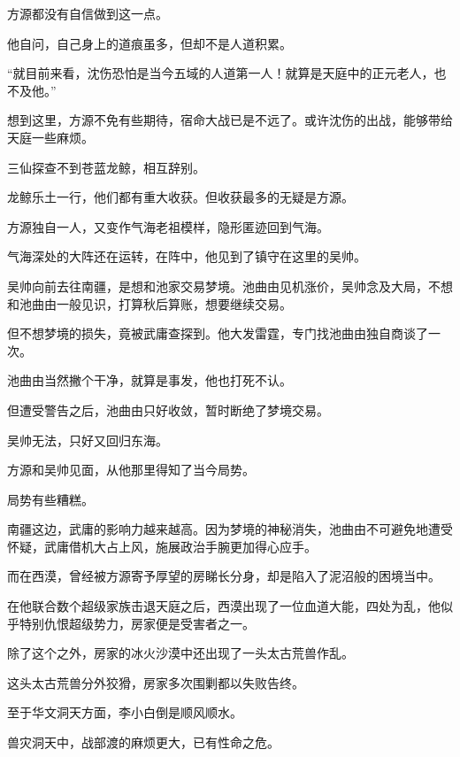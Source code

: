 \begin{this_body}
方源都没有自信做到这一点。

他自问，自己身上的道痕虽多，但却不是人道积累。

“就目前来看，沈伤恐怕是当今五域的人道第一人！就算是天庭中的正元老人，也不及他。”

想到这里，方源不免有些期待，宿命大战已是不远了。或许沈伤的出战，能够带给天庭一些麻烦。

三仙探查不到苍蓝龙鲸，相互辞别。

龙鲸乐土一行，他们都有重大收获。但收获最多的无疑是方源。

方源独自一人，又变作气海老祖模样，隐形匿迹回到气海。

气海深处的大阵还在运转，在阵中，他见到了镇守在这里的吴帅。

吴帅向前去往南疆，是想和池家交易梦境。池曲由见机涨价，吴帅念及大局，不想和池曲由一般见识，打算秋后算账，想要继续交易。

但不想梦境的损失，竟被武庸查探到。他大发雷霆，专门找池曲由独自商谈了一次。

池曲由当然撇个干净，就算是事发，他也打死不认。

但遭受警告之后，池曲由只好收敛，暂时断绝了梦境交易。

吴帅无法，只好又回归东海。

方源和吴帅见面，从他那里得知了当今局势。

局势有些糟糕。

南疆这边，武庸的影响力越来越高。因为梦境的神秘消失，池曲由不可避免地遭受怀疑，武庸借机大占上风，施展政治手腕更加得心应手。

而在西漠，曾经被方源寄予厚望的房睇长分身，却是陷入了泥沼般的困境当中。

在他联合数个超级家族击退天庭之后，西漠出现了一位血道大能，四处为乱，他似乎特别仇恨超级势力，房家便是受害者之一。

除了这个之外，房家的冰火沙漠中还出现了一头太古荒兽作乱。

这头太古荒兽分外狡猾，房家多次围剿都以失败告终。

至于华文洞天方面，李小白倒是顺风顺水。

兽灾洞天中，战部渡的麻烦更大，已有性命之危。

\end{this_body}

